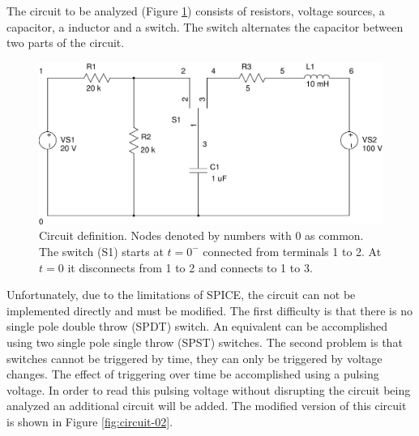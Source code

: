 \documentclass{article}
\begin{document}
The circuit to be analyzed (Figure \ref{fig:circuit}) consists of
resistors, voltage sources, a capacitor, a inductor and a switch.
The switch alternates the capacitor between two parts of the circuit.

\begin{figure}
\center
\includegraphics[scale=0.5]{spice/circuit-01}
\caption{Circuit definition.
Nodes denoted by numbers with 0 as common.
The switch (S1) starts at $t=0^-$ connected from terminals 1 to 2.
At $t=0$ it disconnects from 1 to 2 and connects to 1 to 3.
}
\label{fig:circuit}
\end{figure}

Unfortunately, due to the limitations of SPICE, the circuit can not be
implemented directly and must be modified.
The first difficulty is that there is no single pole double throw (SPDT) switch.
An equivalent can be accomplished using two single pole single throw (SPST)
switches.
The second problem is that switches cannot be triggered by time, they
can only be triggered by voltage changes.
The effect of triggering over time be accomplished using a pulsing voltage.
In order to read this pulsing voltage without disrupting the circuit being
analyzed an additional circuit will be added.
The modified version of this circuit is shown in Figure \ref{fig:circuit-02}.
\end{document}
